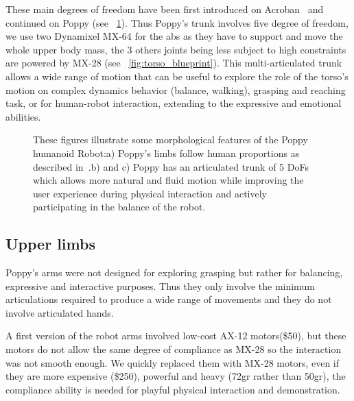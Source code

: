 These main degrees of freedom have been first introduced on Acroban~\parencite{ly2011bio} and continued on Poppy (see \figurename~\ref{fig:poppy_torso}).
Thus Poppy's trunk involves five degree of freedom, we use two Dynamixel MX-64 for the abs as they have to support and move the whole upper body mass, the 3 others joints being less subject to high constraints are powered by MX-28 (see \figurename~\ref{fig:torso_blueprint}). This multi-articulated trunk allows a wide range of motion that can be useful to explore the role of the torso’s motion on complex dynamics behavior (balance, walking), grasping and reaching task, or for human-robot interaction, extending to the expressive and emotional abilities.

\begin{figure}[p]
\centering


    \hfil
    \caption{These figures illustrate some morphological features of the Poppy humanoid Robot:\newline a) Poppy's limbs follow human proportions as described in~\parencite{dufour2005biomecanique}.\newline b) and c) Poppy has an articulated trunk of 5 DoFs which allows more natural and fluid motion while improving the user experience during physical interaction and actively participating in the balance of the robot.}
    \label{fig:poppy_torso}
\end{figure}



\subsection{Upper limbs} %

Poppy's arms were not designed for exploring grasping but rather for balancing, expressive and interactive purposes. Thus they only involve the minimum articulations required to produce a wide range of movements and they do not involve articulated hands.

A first version of the robot arms involved low-cost AX-12 motors(\$50), but these motors do not allow the same degree of compliance as MX-28 so the interaction was not smooth enough. We quickly replaced them with MX-28 motors, even if they are more expensive (\$250), powerful and heavy (72gr rather than 50gr), the compliance ability is needed for playful physical interaction and demonstration.

